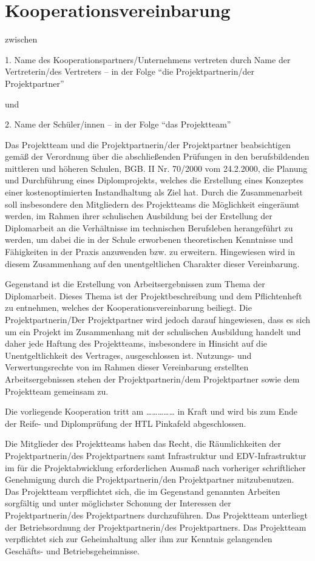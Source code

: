 \chapter{Kooperationsvereinbarung}

zwischen 

1. Name des Kooperationspartners/Unternehmens vertreten durch Name der Vertreterin/des Vertreters – in der Folge "`die Projektpartnerin/der Projektpartner"' 

und 

2. Name der Schüler/innen – in der Folge "`das Projektteam"'


Das Projektteam und die Projektpartnerin/der Projektpartner beabsichtigen gemäß der Verordnung über die abschließenden Prüfungen in den berufsbildenden mittleren und höheren Schulen, BGB. II Nr. 70/2000 vom 24.2.2000, die Planung und Durchführung eines Diplomprojekts, welches die Erstellung eines Konzeptes einer kostenoptimierten Instandhaltung als Ziel hat. Durch die Zusammenarbeit soll insbesondere den Mitgliedern des Projektteams die Möglichkeit eingeräumt werden, im Rahmen ihrer schulischen Ausbildung bei der Erstellung der Diplomarbeit an die Verhältnisse im technischen Berufsleben herangeführt zu werden, um dabei die in der Schule erworbenen theoretischen Kenntnisse und Fähigkeiten in der Praxis anzuwenden bzw. zu erweitern. Hingewiesen wird in diesem Zusammenhang auf den unentgeltlichen Charakter dieser Vereinbarung. 

Gegenstand ist die Erstellung von Arbeitsergebnissen zum Thema der Diplomarbeit. Dieses Thema ist der Projektbeschreibung und dem Pflichtenheft zu entnehmen, welches der Kooperationsvereinbarung beiliegt. Die Projektpartnerin/Der Projektpartner wird jedoch darauf hingewiesen, dass es sich um ein Projekt im Zusammenhang mit der schulischen Ausbildung handelt und daher jede Haftung des Projektteams, insbesondere in Hinsicht auf die Unentgeltlichkeit des Vertrages, ausgeschlossen ist. Nutzungs- und Verwertungsrechte von im Rahmen dieser Vereinbarung erstellten Arbeitsergebnissen stehen der Projektpartnerin/dem Projektpartner sowie dem Projektteam gemeinsam zu. 

Die vorliegende Kooperation tritt am …………… in Kraft und wird bis zum Ende der Reife- und Diplomprüfung der HTL Pinkafeld abgeschlossen. 

Die Mitglieder des Projektteams haben das Recht, die Räumlichkeiten der Projektpartnerin/des Projektpartners samt Infrastruktur und EDV-Infrastruktur im für die Projektabwicklung erforderlichen Ausmaß nach vorheriger schriftlicher Genehmigung durch die Projektpartnerin/den Projektpartner mitzubenutzen. Das Projektteam verpflichtet sich, die im Gegenstand genannten Arbeiten sorgfältig und unter möglichster Schonung der Interessen der Projektpartnerin/des Projektpartners durchzuführen. Das Projektteam unterliegt der Betriebsordnung der Projektpartnerin/des Projektpartners. Das Projektteam verpflichtet sich zur Geheimhaltung aller ihm zur Kenntnis gelangenden Geschäfts- und Betriebsgeheimnisse. 


